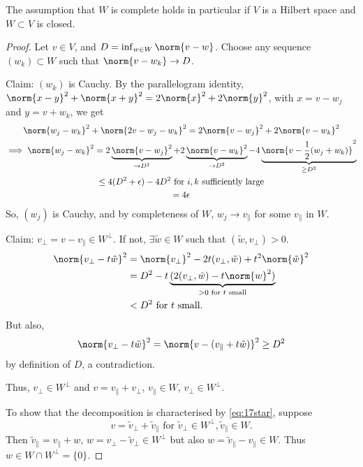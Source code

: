 \documentclass{article}
\begin{document}
The assumption that $W$ is complete holds in particular if $V$ is a Hilbert space and $W \subset V$ is closed.

\begin{proof}
    Let $v \in V$, and $D = \inf_{w \in W} \norm{v - w}$. Choose any sequence $(w_k) \subset W$ such that $\norm{v - w_k} \to D$.

    Claim: $(w_k)$ is Cauchy.
    By the parallelogram identity, $\norm{x - y}^2 + \norm{x+y}^2 = 2 \norm{x}^2 + 2 \norm{y}^2$, with $x = v-w_j$ and $y = v+w_k$, we get
    \begin{gather}
        \norm{w_j - w_k}^2 + \norm{2v - w_j - w_k}^2 = 2 \norm{v - w_j}^2 + 2 \norm{v - w_k}^2 \\
        \implies \norm{w_j - w_k}^2 = 2 \underbrace{\norm{v - w_j}^2}_{\to D^2} + 2 \underbrace{\norm{v - w_k}^2}_{\to D^2} - 4 \underbrace{\norm{v - \frac{1}{2}(w_j + w_k)}^2}_{\geq D^2} \\
        \leq 4(D^2 + \epsilon) - 4D^2 \text{ for $i, k$ sufficiently large} \\
        = 4\epsilon
    \end{gather}
    So, $(w_j)$ is Cauchy, and by completeness of $W$, $w_j \to v_\parallel$ for some $v_\parallel$ in $W$.


    Claim: $v_\perp = v - v_\parallel \in W^\perp$. If not, $\exists \tilde{w} \in W$ such that $(\tilde{w}, v_\perp) > 0$.
    \begin{align*}
        \norm{v_\perp - t \tilde{w}}^2 &= \norm{v_\perp}^2 - 2 t (v_\perp, \tilde{w}) + t^2 \norm{\tilde{w}}^2 \\
                                       &= D^2 - t\underbrace{(2 (v_\perp, \tilde{w}) - t \norm{w}^2)}_{>0 \text{ for $t$ small}} \\
                                       &< D^2 \text{ for $t$ small.}
    \end{align*}
    But also,
    \begin{equation*}
        \norm{v_\perp - t \tilde{w}}^2 = \norm{v - (v_\parallel + t \tilde{w})}^2 \geq D^2
    \end{equation*}
    by definition of $D$, a contradiction.

    Thus, $v_\perp \in W^\perp$ and $v = v_\parallel + v_\perp$, $v_\parallel \in W$, $v_\perp \in W^\perp$.

    To show that the decomposition is characterised by \eqref{eq:17star}, suppose
    \begin{equation*}
        v = \tilde{v}_\perp + \tilde{v}_\parallel \text{ for } \tilde{v}_\perp \in W^\perp, \tilde{v}_\parallel \in W.
    \end{equation*}
    Then $\tilde{v}_\parallel = v_\parallel + w$, $w = v_\perp - \tilde{v}_\perp \in W^\perp$ but also $w = \tilde{v}_\parallel - v_\parallel \in W$. Thus $w \in W \cap W^\perp = \{0\}$.
\end{proof}
\end{document}
